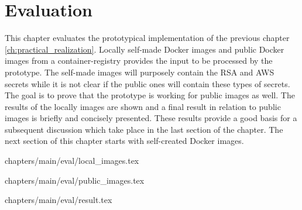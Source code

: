 \chapter{Evaluation}
\label{ch:eval}
This chapter evaluates the prototypical implementation of the previous chapter \ref{ch:practical_realization}. 
Locally self-made Docker images and public Docker images from a container-registry provides the input to be processed by the prototype. The self-made images will purposely contain the RSA and AWS secrets while it is not clear if the public ones will contain these types of secrets. The goal is to prove that the prototype is working for public images as well.
The results of the locally images are shown and a final result in relation to public images is briefly and concisely presented.
These results provide a good basis for a subsequent discussion which take place in the last section of the chapter.
The next section of this chapter starts with self-created Docker images.

 {chapters/main/eval/local_images.tex}

 {chapters/main/eval/public_images.tex}

 {chapters/main/eval/result.tex}